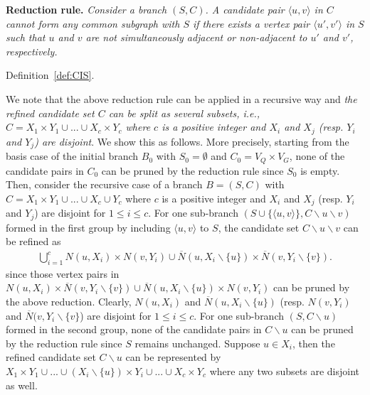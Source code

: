 {\Yui
\noindent\textbf{Reduction {\chengC rule}.} \emph{Consider a branch $(S,C)$. A candidate pair $\langle u,v \rangle$ in $C$ cannot form any common subgraph with $S$ if there exists a vertex pair $\langle u',v' \rangle$ in $S$ such that $u$ and $v$ are not simultaneously adjacent or non-adjacent to $u'$ and $v'$, respectively.} 

    Definition~\ref{def:CIS}. 
%
%
{
%
We note that the above reduction rule can be applied in a recursive way and \emph{the refined candidate set $C$ can be split as several subsets, i.e., $C=X_1\times Y_1 \cup ... \cup X_c \times Y_c$ where $c$ is a positive integer and $X_i$ and $X_j$ (resp. $Y_i$ and $Y_j$) are disjoint}. We show this as follows.
%
More precisely, starting from the basis case of the initial branch $B_0$ with $S_0=\emptyset$ and $C_0= V_Q\times V_G $, none of the candidate pairs in $C_0$ can be pruned by the reduction rule since $S_0$ is empty. Then, consider the recursive case of a branch $B=(S,C)$ with $C=X_1\times Y_1 \cup ... \cup X_c \cup Y_c $ where $c$ is a positive integer and $X_i$ and $X_j$ (resp. $Y_i$ and $Y_j$) are disjoint for $1\leq i\leq c$. For one sub-branch $(S\cup\{\langle u,v\rangle\},C\backslash u\backslash v)$ formed in the first group by including $\langle u,v\rangle$ to $S$, the candidate set $C\backslash u \backslash v$ can be refined as
\begin{eqnarray}
    \label{eq:update_candidate_set}
    \bigcup_{i=1}^c  N(u,X_i)\times N(v,Y_i)  \cup  \overline{N}(u,X_i\backslash \{u\})\times \overline{N}(v, Y_i\backslash\{v\}). 
\end{eqnarray}
since those vertex pairs in $N(u,X_i)\times \overline{N}(v, Y_i\backslash\{v\})  \cup  \overline{N}(u,X_i\backslash \{u\})\times N(v,Y_i)$ can be pruned by the above reduction. Clearly, $N(u,X_i)$ and $\overline{N}(u,X_i\backslash \{u\})$ (resp. $N(v,Y_i)$ and $\overline{N}(v, Y_i\backslash\{v\}$) are disjoint for $1\leq i\leq c$. For one sub-branch $(S,C\backslash u)$ formed in the second group, none of the candidate pairs in $C\backslash u$ can be pruned by the reduction rule since $S$ remains unchanged. Suppose $u\in X_i$, then the refined candidate set $C\backslash u$ can be represented by $X_1\times Y_1\cup ... \cup (X_i\backslash\{u\})\times Y_i \cup ...\cup X_c\times Y_c$ where any two subsets are disjoint as well.

}}
